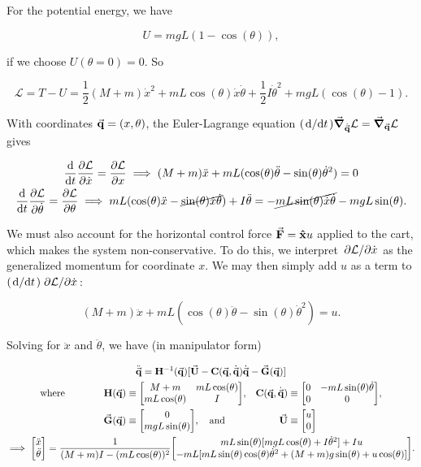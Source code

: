 \documentclass{article}
\newcommand{\Lag}{\mathcal{L}}
\begin{document}
    For the potential energy, we have

    \[
        U = mgL(1 - \cos(\theta)),
    \]

    if we choose $U(\theta = 0) = 0$.
    So

    \[
        \Lag = T - U = \frac{1}{2}(M + m)\dot{x}^2 + mL\cos(\theta)\dot{x}\dot{\theta} + \frac{1}{2}I\dot{\theta}^2 + mgL(\cos(\theta) - 1).
    \]

    With coordinates $\va{q} = (x, \theta)$, the Euler-Lagrange equation $(\dv*{t})\grad_{\dot{\va{q}}}\Lag = \grad_{\va{q}}\Lag$ gives

    \begin{gather*}
        \dv{t}\pdv{\Lag}{\dot{x}} = \pdv{\Lag}{x} \implies (M + m)\ddot{x} + mL(\cos(\theta)\ddot{\theta} - \sin(\theta)\dot{\theta}^2) = 0\\
        \dv{t}\pdv{\Lag}{\dot{\theta}} = \pdv{\Lag}{\theta} \implies mL(\cos(\theta)\ddot{x} - \cancel{\sin(\theta)\dot{x}\dot{\theta}}) + I\ddot{\theta} = -\cancel{mL\sin(\theta)\dot{x}\dot{\theta}} - mgL\sin(\theta).
    \end{gather*}

    We must also account for the horizontal control force $\va{F} = \vu{x}u$ applied to the cart, which makes the system non-conservative.
    To do this, we interpret $\pdv*{\Lag}{\dot{x}}$ as the generalized momentum for coordinate $x$.
    We may then simply add $u$ as a term to $(\dv*{t})\pdv*{\Lag}{\dot{x}}$:

    \[
        (M + m)\ddot{x} + mL(\cos(\theta)\ddot{\theta} - \sin(\theta)\dot{\theta}^2) = u.
    \]

    Solving for $\ddot{x}$ and $\ddot{\theta}$, we have (in manipulator form)

    \begin{gather*}
        \ddot{\va{q}} = \vb{H}^{-1}(\va{q})[\va{U} - \vb{C}(\va{q}, \dot{\va{q}})\dot{\va{q}} - \va{G}(\va{q})]\\
        \text{where} \qquad \begin{aligned}[t]
                \qquad \vb{H}(\va{q}) &\equiv \mqty[M + m & mL\cos(\theta) \\ mL\cos(\theta) & I] ,& \vb{C}(\va{q}, \dot{\va{q}}) &\equiv \mqty[0 & -mL\sin(\theta)\dot{\theta} \\ 0 & 0] ,\\
            \va{G}(\va{q}) &\equiv \mqty[0 \\ mgL\sin(\theta)] ,\qq{and}& \va{U} &\equiv \mqty[u\\0]
        \end{aligned}\\
        \implies \mqty[\ddot{x} \\ \ddot{\theta}] = \frac{1}{(M + m)I - (mL\cos(\theta))^2}\mqty[mL\sin(\theta)[mgL\cos(\theta) + I\dot{\theta}^2] + Iu \\ -mL[mL\sin(\theta)\cos(\theta)\dot{\theta}^2 + (M + m)g\sin(\theta) + u\cos(\theta)]].
    \end{gather*}
\end{document}
